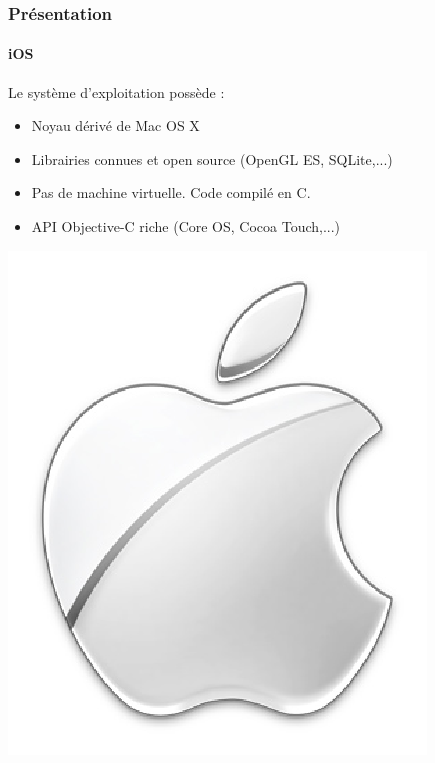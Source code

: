 \begin{frame}
\frametitle{Présentation}
\framesubtitle{iOS}
	\begin{minipage}{8cm}
Le système d'exploitation possède : \\

	\begin{itemize} 
		\item Noyau dérivé de Mac OS X
		\item Librairies connues et open source (OpenGL ES, SQLite,...)
		\item Pas de machine virtuelle. Code compilé en C.
		\item API Objective-C riche (Core OS, Cocoa Touch,...)
	\end{itemize}
	\end{minipage}  \includegraphics[scale=0.2]{img/apple.png} 
\end{frame}


 



